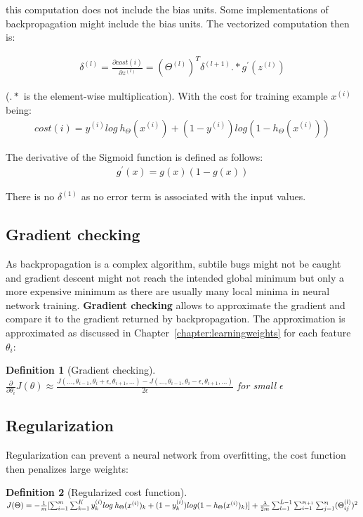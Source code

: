 \documentclass{report}
\newtheorem{definition}{Definition}[section]
\begin{document}
this computation does not include the bias units. Some implementations of backpropagation might include the bias units.
The vectorized computation then is:

\begin{align*}
\delta^{(l)} = \frac{\partial cost(i)}{\partial z^{(l)}} =(\Theta^{(l)})^T\delta^{(l+1)}.*g^{'}(z^{(l)})
\end{align*}

($.*$ is the element-wise multiplication). With the cost for training example $x^{(i)}$ being:
\begin{align*}
cost(i) = y^{(i)}log\:h_{\Theta}(x^{(i)})+(1-y^{(i)})log(1-h_{\Theta}(x^{(i)}))
\end{align*}

The derivative of the Sigmoid function is defined as follows:
\begin{align*}
g^{'}(x)=g(x)(1-g(x))
\end{align*}

There is no $\delta^{(1)}$ as no error term is associated with the input values.


\subsection{Gradient checking}
As backpropagation is a complex algorithm, subtile bugs might not be caught and gradient descent might not reach the intended global minimum but only a more expensive minimum as there are usually many local minima in neural network training.
{\bf Gradient checking} allows to approximate the gradient and compare it to the gradient returned by backpropagation.
The approximation is approximated as discussed in Chapter~\ref{chapter:learningweights} for each feature $\theta_i$:
\begin{definition}[Gradient checking] ~\\
$\frac{\partial}{\partial\theta_i}J(\theta)\approx\frac{J(...,\theta_{i-1},\theta_{i}+\epsilon,\theta_{i+1},...)-J(...,\theta_{i-1},\theta_{i}-\epsilon,\theta_{i+1},...)}{2\epsilon}$ for small $\epsilon$
\end{definition}

\subsection{Regularization}
Regularization can prevent a neural network from overfitting, the cost function then penalizes large weights:

\begin{definition}[Regularized cost function] ~\\
$J(\Theta) = -\frac{1}{m}[\sum_{i=1}^m \sum_{k=1}^K y_k^{(i)}log\:h_{\Theta}(x^{(i)})_k+(1-y_k^{(i)})log(1-h_{\Theta}(x^{(i)})_k)] \\
+ \frac{\lambda}{2m}\sum_{l=1}^{L-1}\sum_{i=1}^{s_{l+1}}\sum_{j=1}^{s_{l}}(\Theta_{ij}^{(l)})^2$
\end{definition}
\end{document}
